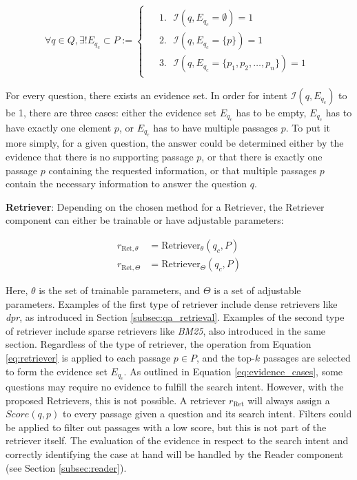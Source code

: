 \begin{equation}
    \forall q \in Q, \exists! E_{q_c} \subset P  := 
    \begin{cases}
        \begin{aligned}
            &1. \text{ } \mathcal{I}(q,E_{q_c} = \emptyset) = 1 \\
            &2. \text{ } \mathcal{I}(q,E_{q_c} = \{p\}) = 1 \\
            &3. \text{ } \mathcal{I}(q,E_{q_c} = \{p_1, p_2, \dots, p_n\}) = 1
        \end{aligned}
    \end{cases}
    \label{eq:evidence_cases}
\end{equation}

For every question, there exists an evidence set. In order for intent $\mathcal{I}(q,E_{q_c})$ to be 1, there are three cases: either the evidence set $E_{q_c}$ has to be empty, $E_{q_c}$ has to have exactly one element $p$, or $E_{q_c}$ has to have multiple passages $p$. To put it more simply, for a given question, the answer could be determined either by the evidence that there is no supporting passage $p$, or that there is exactly one passage $p$ containing the requested information, or that multiple passages $p$ contain the necessary information to answer the question $q$.

\vspace{\baselineskip}

\textbf{Retriever}: Depending on the chosen method for a Retriever, the Retriever component can either be trainable or have adjustable parameters:

\begin{align}
    r_{\text{Ret}, \theta} &= \text{Retriever}_\theta(q_c, P) \\
    r_{\text{Ret}, \Theta} &= \text{Retriever}_\Theta(q_c, P)
\end{align}

Here, $\theta$ is the set of trainable parameters, and $\Theta$ is a set of adjustable parameters. Examples of the first type of retriever include dense retrievers like \textit{\gls{dpr}}, as introduced in Section \ref{subsec:qa_retrieval}. Examples of the second type of retriever include sparse retrievers like \textit{BM25}, also introduced in the same section. Regardless of the type of retriever, the operation from Equation \ref{eq:retriever} is applied to each passage $p \in P$, and the top-$k$ passages are selected to form the evidence set $E_{q_c}$. As outlined in Equation \ref{eq:evidence_cases}, some questions may require no evidence to fulfill the search intent. However, with the proposed Retrievers, this is not possible. A retriever $r_{\text{Ret}}$ will always assign a $Score(q,p)$ to every passage given a question and its search intent. Filters could be applied to filter out passages with a low score, but this is not part of the retriever itself. The evaluation of the evidence in respect to the search intent and correctly identifying the case at hand will be handled by the Reader component (see Section \ref{subsec:reader}).

